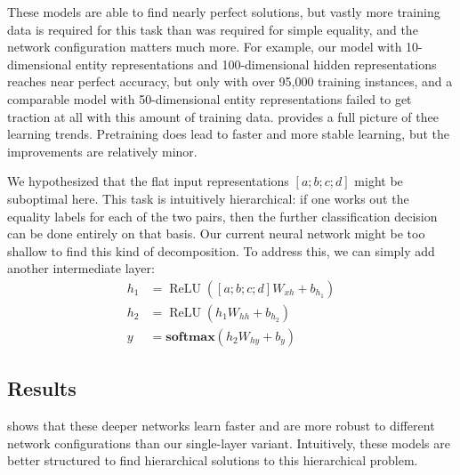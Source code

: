 \documentclass[9pt,twocolumn,twoside,lineno]{pnas-new}
\newcommand{\update}[1]{{\color{darkblue}#1}}
\newcommand{\softmax}{\mathbf{softmax}}
\DeclareMathOperator{\ReLU}{ReLU}
\begin{document}
These models are able to find nearly perfect solutions, but vastly more training data is required for this task than was required for simple equality, and the network configuration matters much more. For example, our model with 10-dimensional entity representations and 100-dimensional hidden representations reaches near perfect accuracy, but only with over 95,000 training instances, and a comparable model with 50-dimensional entity representations failed to get traction at all with this amount of training data. \update{ provides a full picture of thee learning trends. Pretraining does lead to faster and more stable learning, but the improvements are relatively minor.}

We hypothesized that the flat input representations $[a;b;c;d]$ might be suboptimal here. This task is intuitively hierarchical: if one works out the equality labels for each of the two pairs, then the further classification decision can be done entirely on that basis. Our current neural network might be too shallow to find this kind of decomposition.  To address this, we can simply add another intermediate layer:
%
\begin{align}
  h_{1} &= \ReLU([a;b;c;d]W_{xh} + b_{h_{1}}) \label{eq:x2h1}\\
  h_{2} &= \ReLU(h_{1}W_{hh} + b_{h_{2}}) \label{eq:x2h2}\\
  y &= \softmax(h_{2}W_{hy} + b_{y}) \label{eq:h2y2}
\end{align}


\subsection*{Results}

\update{ shows that} these deeper networks learn faster and are more robust to different network configurations than our single-layer variant. Intuitively, these models are better structured to find hierarchical solutions to this hierarchical problem.
\end{document}
